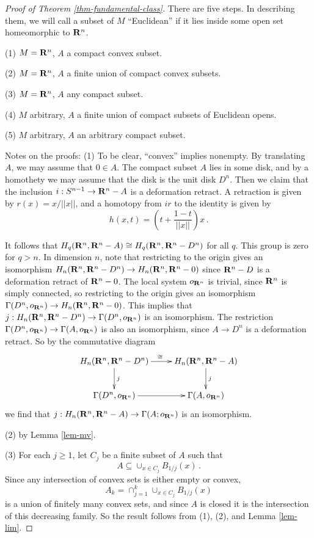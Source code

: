 \begin{proof}[Proof of Theorem \ref{thm-fundamental-class}] 
There are five steps. In describing them, we will call a subset of $M$
``Euclidean'' if it lies inside some open set homeomorphic to $\mathbf R^n$.

\noindent
(1) $M=\mathbf R^n$, $A$ a compact convex subset.

\noindent
(2) $M=\mathbf R^n$, $A$ a finite union of compact convex subsets.

\noindent
(3) $M=\mathbf R^n$, $A$ any compact subset.

\noindent
(4) $M$ arbitrary, $A$ a finite union of compact subsets of Euclidean opens.

\noindent
(5) $M$ arbitrary, $A$ an arbitrary compact subset. 

Notes on the proofs: (1) To be clear, ``convex'' implies nonempty. 
By translating $A$, we may assume that $0\in A$. The compact subset $A$
lies in some disk, and by a homothety we may assume that the disk is the
unit disk $D^n$. Then we claim that the inclusion $i:S^{n-1}\to\mathbf R^n-A$
is a deformation retract. A retraction is given by $r(x)=x/||x||$, 
and a homotopy from $ir$ to the identity is given by 
\[
h(x,t)=\left(t+\frac{1-t}{||x||}\right)x\,.
\]

It follows that $H_q(\mathbf R^n,\mathbf R^n-A)\cong H_q(\mathbf R^n,\mathbf R^n-D^n)$ for all
$q$. This group is zero for $q>n$. In dimension $n$, note that restricting
to the origin gives an isomorphism 
$H_n(\mathbf R^n,\mathbf R^n-D^n)\to H_n(\mathbf R^n,\mathbf R^n-0)$ since 
$\mathbf R^n-D$ is a deformation retract of $\mathbf R^n-0$. The local system $o_{\mathbf R^n}$ 
is trivial, since $\mathbf R^n$ is simply connected, so restricting to the origin
gives an isomorphism $\Gamma(D^n,o_{\mathbf R^n})\to H_n(\mathbf R^n,\mathbf R^n-0)$. 
This implies that $j:H_n(\mathbf R^n,\mathbf R^n-D^n)\to\Gamma(D^n,o_{\mathbf R^n})$
is an isomorphism. The restriction 
$\Gamma(D^n,o_{\mathbf R^n})\to\Gamma(A,o_{\mathbf R^n})$ is also an isomorphism, since
$A\to D^n$ is a deformation retract. So by the commutative diagram
\[
\xymatrix{
H_n(\RR^n,\RR^n-D^n) \ar[r]^\cong \ar[d]^j & H_n(\RR^n,\RR^n-A) \ar[d]^j \\
\Gamma(D^n,o_{\RR^n}) \ar[r] & \Gamma(A,o_{\RR^n}) 
}\]
we find that $j:H_n(\mathbf R^n,\mathbf R^n-A)\to\Gamma(A;o_{\mathbf R^n})$ is an isomorphism.

(2) by Lemma \ref{lem-mv}. 

(3) For each $j\geq1$, let $C_j$ be a finite subset of $A$ such that 
\[
A\subseteq \cup_{x\in C_j}B_{1/j}(x)\,.
\]
Since any intersection of convex sets is either empty or convex, 
\[
A_k=\cap_{j=1}^k\cup_{x\in C_j}B_{1/j}(x)
\]
is a union of finitely many convex sets, and since $A$ is closed
it is the intersection of this decreasing family. So the result
follows from (1), (2), and Lemma \ref{lem-lim}.


\end{proof}
